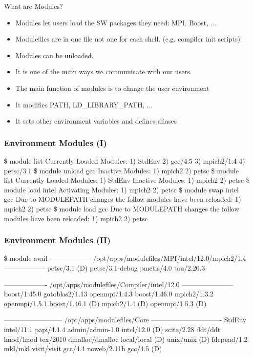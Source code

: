 \documentclass{beamer}
\begin{document}
\begin{frame}{What are Modules?}
  \begin{itemize}
    \item Modules let users load the SW packages they need: MPI, Boost, ...
    \item Modulefiles are in one file not one for each
      shell. (e.g. compiler init scripts)
    \item Modules can be unloaded.
    \item It is one of the main ways we communicate with our users.
    \item The main function of modules is to change the user environment
    \item It modifies PATH, LD\_LIBRARY\_PATH, ...
    \item It sets other environment variables and defines aliases
  \end{itemize}
\end{frame}

\begin{frame}[fragile]
    \frametitle{Environment Modules (I)}
    {\tiny
\begin{semiverbatim}
{\color{blue}\$ module list}
Currently Loaded Modules:
  1) StdEnv  2) gcc/4.5  3) mpich2/1.4  4) petsc/3.1
{\color{blue}\$ module unload gcc}
Inactive Modules:
  1) mpich2  2) petsc
{\color{blue}\$ module list}
Currently Loaded Modules:
  1) StdEnv
Inactive Modules:
  1) mpich2  2) petsc
{\color{blue}\$ module load intel}
Activating Modules:
  1) mpich2  2) petsc
{\color{blue}\$ module swap intel gcc}
Due to MODULEPATH changes the follow modules have been reloaded:
  1) mpich2  2) petsc
{\color{blue}\$ module load gcc}
Due to MODULEPATH changes the follow modules have been reloaded:
  1) mpich2  2) petsc
\end{semiverbatim}
    }
\end{frame}

\begin{frame}[fragile]
    \frametitle{Environment Modules (II)}
    {\tiny
\begin{semiverbatim}
\$ {\color{blue} module avail}
------------------ /opt/apps/modulefiles/MPI/intel/12.0/mpich2/1.4 ------------------
  petsc/3.1 (D)    petsc/3.1-debug    pmetis/4.0    tau/2.20.3

------------------- /opt/apps/modulefiles/Compiler/intel/12.0 -----------------------
  boost/1.45.0        gotoblas2/1.13      openmpi/1.4.3
  boost/1.46.0        mpich2/1.3.2        openmpi/1.5.1
  boost/1.46.1 (D)    mpich2/1.4    (D)   openmpi/1.5.3   (D)

-------------------------- /opt/apps/modulefiles/Core -------------------------------
  StdEnv               intel/11.1         papi/4.1.4
  admin/admin-1.0      intel/12.0  (D)    scite/2.28
  ddt/ddt              lmod/lmod          tex/2010
  dmalloc/dmalloc      local/local (D)    unix/unix    (D)
  fdepend/1.2          mkl/mkl            visit/visit
  gcc/4.4              noweb/2.11b
  gcc/4.5        (D)
\end{semiverbatim}
    }
\end{frame}
\end{document}
